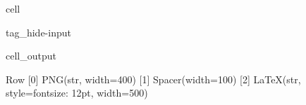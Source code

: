 \documentclass[letterpaper,10pt,english]{jupyterBook}
\begin{document}
\begin{sphinxuseclass}{cell}
\begin{sphinxuseclass}{tag_hide-input}\begin{sphinxVerbatimOutput}

\begin{sphinxuseclass}{cell_output}
\begin{sphinxVerbatim}[commandchars=\\\{\}]
Row
    [0] PNG(str, width=400)
    [1] Spacer(width=100)
    [2] LaTeX(str, style=\PYGZob{}\PYGZsq{}font\PYGZhy{}size\PYGZsq{}: \PYGZsq{}12pt\PYGZsq{}\PYGZcb{}, width=500)
\end{sphinxVerbatim}

\end{sphinxuseclass}\end{sphinxVerbatimOutput}

\end{sphinxuseclass}
\end{sphinxuseclass}
\end{document}
